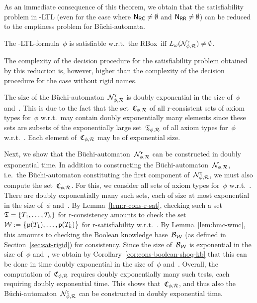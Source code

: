 \noindent
As an immediate consequence of this theorem, we obtain that the satisfiability
problem in \SHOQ-LTL (even for the case where $\mathsf{N_{RC}}\ne\emptyset$ and
$\mathsf{N_{RR}}\ne\emptyset$) can be reduced to the emptiness problem for Büchi-automata.

\begin{corollary}
    The \SHOQ-LTL-formula~$\phi$ is satisfiable w.r.t.\ the RBox~\Rmc iff
    $L_\omega(\mathcal{N}_{\phi,\mathcal{R}}^\text{r})\ne\emptyset$.
\end{corollary}

\noindent
The complexity of the decision procedure for the satisfiability problem obtained
by this reduction is, however, higher than the complexity of the decision
procedure for the case without rigid names.

The size of the Büchi-automaton~$\mathcal{N}_{\phi,\mathcal{R}}^\text{r}$ is doubly
exponential in the size of~$\phi$ and~\Rmc.  This is due to the fact that the
set~$\mathfrak{C}_{\phi,\mathcal{R}}$ of all r-consistent sets of axiom types for~$\phi$
w.r.t.~\Rmc may contain doubly exponentially many elements since these sets are
subsets of the exponentially large set~$\mathfrak{T}_{\phi,\mathcal{R}}$ of all axiom types
for~$\phi$ w.r.t.~\Rmc.  Each element of~$\mathfrak{C}_{\phi,\mathcal{R}}$ may be of
exponential size.

Next, we show that the Büchi-automaton~$\mathcal{N}_{\phi,\mathcal{R}}^\text{r}$ can be
constructed in doubly exponential time.  In addition to constructing the
Büchi-automaton~$\mathcal{N}_{\phi,\mathcal{R}}$, i.e.~the Büchi-automaton constituting the
first component of~$\mathcal{N}_{\phi,\mathcal{R}}^\text{r}$, we must also compute the
set~$\mathfrak{C}_{\phi,\mathcal{R}}$.  For this, we consider all sets of axiom types
for~$\phi$ w.r.t.~\Rmc.  There are doubly exponentially many such sets, each of
size at most exponential in the size of~$\phi$ and~\Rmc.  By
Lemma~\ref{lem:r-cons-r-sat}, checking such a set $\mathfrak{T}=\{T_1,\dots,T_k\}$ for
r-consistency amounts to check the set
$\mathcal{W}:=\bigl\{\mathsf{p}(T_1),\dots,\mathsf{p}(T_k)\bigr\}$ for r-satisfiability
w.r.t.~\Rmc.  By Lemma~\ref{lem:bmc-wmc}, this amounts to checking the Boolean
knowledge base~$\mathcal{B}_\mathcal{W}$ (as defined in Section~\ref{sec:sat-rigid}) for
consistency.  Since the size of~$\mathcal{B}_\mathcal{W}$ is exponential in the size of~$\phi$
and~\Rmc, we obtain by Corollary~\ref{cor:cons-boolean-shoq-kb} that this can be
done in time doubly exponential in the size of~$\phi$ and~\Rmc.  Overall, the
computation of~$\mathfrak{C}_{\phi,\mathcal{R}}$ requires doubly exponentially many such tests,
each requiring doubly exponential time.  This shows that~$\mathfrak{C}_{\phi,\mathcal{R}}$, and
thus also the Büchi-automaton~$\mathcal{N}_{\phi,\mathcal{R}}^\text{r}$ can be constructed in
doubly exponential time.

